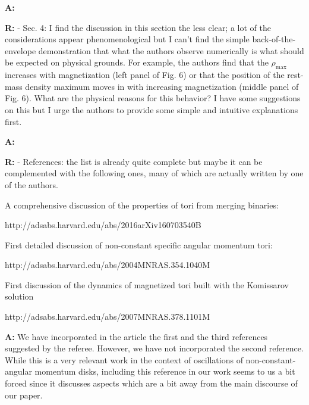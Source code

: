 \documentclass{article}
\begin{document}
\bigskip

{\bf A:} 

\bigskip

{\bf R:} - Sec. 4: I find the discussion in this section the less clear; a lot
of the considerations appear phenomenological but I can't find the
simple back-of-the-envelope demonstration that what the authors observe
numerically is what should be expected on physical grounds. For
example, the authors find that the $\rho_{\mathrm{max}}$ increases with magnetization
(left panel of Fig. 6) or that the position of the rest-mass density
maximum moves in with increasing magnetization (middle panel of
Fig. 6). What are the physical reasons for this behavior? I have some
suggestions on this but I urge the authors to provide some simple and
intuitive explanations first.

\bigskip

{\bf A:}

\bigskip

{\bf R:} - References: the list is already quite complete but maybe it can be
complemented with the following ones, many of which are actually
written by one of the authors.

A comprehensive discussion of the properties of tori from merging binaries:

http://adsabs.harvard.edu/abs/2016arXiv160703540B


First detailed discussion of non-constant specific angular momentum tori:

http://adsabs.harvard.edu/abs/2004MNRAS.354.1040M

First discussion of the dynamics of magnetized tori built with the Komissarov solution

http://adsabs.harvard.edu/abs/2007MNRAS.378.1101M

\bigskip

{\bf A:} We have incorporated in the article the first and the third references 
suggested by the referee. However, we have not incorporated the second 
reference. While this is a very relevant work in the context of oscillations 
of non-constant-angular momentum disks, including this reference in our 
work seems to us a bit forced since it discusses aspects which are a bit 
away from the main discourse of our paper.


\begin{small}
\begin{thebibliography}{99}
%

%  
\end{thebibliography}

 \end{small}

 
\end{document}
